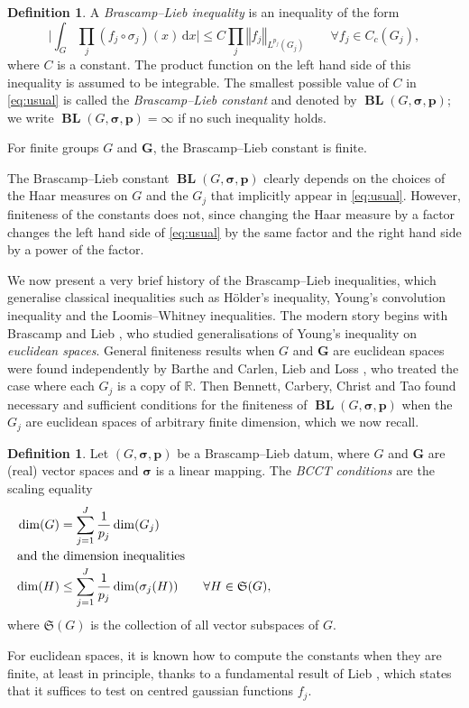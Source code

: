 \documentclass[12pt,twoside,a4paper]{amsart}
\theoremstyle{definition}
\newtheorem{defn}[thm]{Definition}%
\theoremstyle{remark}
\numberwithin{equation}{section}
\newcommand{\R}{\mathbb{R}}
\newcommand{\Lie}[1]{\mathfrak{#1}}
\newcommand{\wrt}[1]{\,\mathrm{d} #1}
\newcommand{\BL}{\operatorname{\mathbf{BL}}}
\newcommand{\bss}{\boldsymbol{\sigma}}
\newcommand{\bsp}{\boldsymbol{p}}
\newcommand{\bsG}{\boldsymbol{G}}
\newcommand{\bigglabs}{\biggl\vert}
\newcommand{\biggrabs}{\biggr\vert}
\begin{document}
\begin{defn}%
A \emph{Brascamp--Lieb inequality} is an inequality of the form
\begin{equation}\label{eq:usual}
\bigglabs \int_{G} \prod_j   (f_j \circ \sigma_j)(x) \wrt x \biggrabs  
\leq C \prod_{j} \left\Vert f_j \right\Vert_{L^{p_j}(G_j)}
\qquad\forall f_j \in C_c(G_j) ,
\end{equation}
where $C$ is a constant.
The product function on the left hand side of this inequality is assumed to be integrable.
The smallest possible value of $C$ in \eqref{eq:usual} is called the \textit{Brascamp--Lieb constant} and denoted by $\BL(G, \bss, \bsp)$; we write $\BL(G,\bss,\bsp) = \infty$ if no such inequality holds. 
\end{defn}

For finite groups $G$ and $\bsG$, the Brascamp--Lieb constant is finite.

The Brascamp--Lieb constant $\BL(G, \bss, \bsp)$ clearly depends on the choices of the Haar measures on $G$ and the $G_j$ that implicitly appear in \eqref{eq:usual}.
However, finiteness of the constants does not, since changing the Haar measure by a factor changes the left hand side of \eqref{eq:usual}  by the same factor and the right hand side  by a power of the factor.

We now present a very brief history of the Brascamp--Lieb inequalities, which  generalise classical inequalities such as Hölder's inequality, Young's convolution inequality and the Loomis--Whitney inequalities.
The modern story begins with Brascamp and Lieb \cite{BL76}, who studied generalisations of Young's inequality on \emph{euclidean spaces}.
General finiteness results when $G$ and $\bsG$ are euclidean spaces were found independently by Barthe \cite{Barthe98} and Carlen, Lieb and Loss \cite{CLL04}, who treated the case where each $G_j$ is a copy of $\R$.
Then Bennett, Carbery, Christ and Tao \cite{BCCT08} found necessary and sufficient conditions for the finiteness of $\BL(G,\bss,\bsp)$ when the $G_j$ are euclidean spaces of arbitrary finite dimension, which we now recall.
\begin{defn}\label{def:BCCT}
Let $(G, \bss,\bsp)$ be a Brascamp--Lieb datum, where $G$ and $\bsG$ are (real) vector spaces and $\bss$ is a linear mapping.
The \emph{BCCT conditions} are the scaling equality
\begin{align}\label{eq:BCCT-1}
\dim(G) &=\sum^J_{j=1}\frac{1}{p_j} \dim(G_j)           \\
\noalign{\noindent and the dimension inequalities}
\label{eq:BCCT-2}
\dim(H)  &\leq \sum^J_{j=1}\frac{1}{p_j} \dim(\sigma_{j}(H))
\qquad \forall H \in \Lie{S} (G) ,       
\end{align}
where $\Lie{S}(G)$ is the collection of all vector subspaces of $G$.
\end{defn}
For euclidean spaces, it is known how to compute the constants when they are finite, at least in principle, thanks to a fundamental result of Lieb \cite{Lieb90}, which states that it suffices to test on centred gaussian functions $f_j$.
\end{document}
